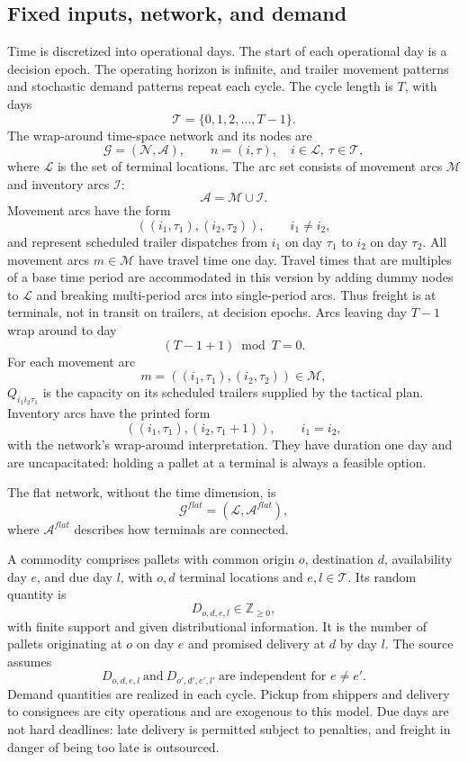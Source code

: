 \documentclass{article}
\begin{document}
\subsection*{Fixed inputs, network, and demand}
Time is discretized into operational days. The start of each operational day is a decision epoch. The operating horizon is infinite, and trailer movement patterns and stochastic demand patterns repeat each cycle. The cycle length is $T$, with days
\[
\mathcal{T}=\{0,1,2,\ldots,T-1\}.
\]
The wrap-around time-space network and its nodes are
\[
\mathcal{G}=(\mathcal{N},\mathcal{A}),\qquad
n=(i,\tau),\quad i\in\mathcal{L},\ \tau\in\mathcal{T},
\]
where $\mathcal{L}$ is the set of terminal locations. The arc set consists of movement arcs $\mathcal{M}$ and inventory arcs $\mathcal{I}$:
\[
\mathcal{A}=\mathcal{M}\cup\mathcal{I}.
\]
Movement arcs have the form
\[
((i_1,\tau_1),(i_2,\tau_2)),\qquad i_1\ne i_2,
\]
and represent scheduled trailer dispatches from $i_1$ on day $\tau_1$ to $i_2$ on day $\tau_2$. All movement arcs $m\in\mathcal{M}$ have travel time one day. Travel times that are multiples of a base time period are accommodated in this version by adding dummy nodes to $\mathcal{L}$ and breaking multi-period arcs into single-period arcs. Thus freight is at terminals, not in transit on trailers, at decision epochs. Arcs leaving day $T-1$ wrap around to day
\[
(T-1+1)\bmod T=0.
\]
For each movement arc
\[
m=((i_1,\tau_1),(i_2,\tau_2))\in\mathcal{M},
\]
$Q_{i_1i_2\tau_1}$ is the capacity on its scheduled trailers supplied by the tactical plan. Inventory arcs have the printed form
\[
((i_1,\tau_1),(i_2,\tau_1+1)),\qquad i_1=i_2,
\]
with the network's wrap-around interpretation. They have duration one day and are uncapacitated: holding a pallet at a terminal is always a feasible option.

The flat network, without the time dimension, is
\[
\mathcal{G}^{flat}=(\mathcal{L},\mathcal{A}^{flat}),
\]
where $\mathcal{A}^{flat}$ describes how terminals are connected.

A commodity comprises pallets with common origin $o$, destination $d$, availability day $e$, and due day $l$, with $o,d$ terminal locations and $e,l\in\mathcal{T}$. Its random quantity is
\[
D_{o,d,e,l}\in\mathbb{Z}_{\geq0},
\]
with finite support and given distributional information. It is the number of pallets originating at $o$ on day $e$ and promised delivery at $d$ by day $l$. The source assumes
\[
D_{o,d,e,l}\ \text{and}\ D_{o',d',e',l'}
\ \text{are independent for }e\ne e'.
\]
Demand quantities are realized in each cycle. Pickup from shippers and delivery to consignees are city operations and are exogenous to this model. Due days are not hard deadlines: late delivery is permitted subject to penalties, and freight in danger of being too late is outsourced.
\end{document}
